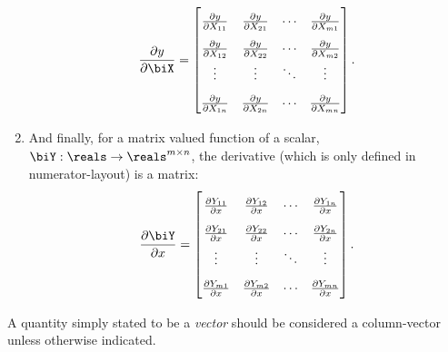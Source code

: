 \begin{enumerate}
\begin{equation*}
    \pdiff{y}{\biX} = \begin{bmatrix}
      \pdiff{y}{X_{11}} & \pdiff{y}{X_{21}} & \cdots & \pdiff{y}{X_{m1}}\\
      \pdiff{y}{X_{12}} & \pdiff{y}{X_{22}} & \cdots & \pdiff{y}{X_{m2}}\\
           \vdots       &      \vdots       & \ddots &      \vdots      \\
      \pdiff{y}{X_{1n}} & \pdiff{y}{X_{2n}} & \cdots & \pdiff{y}{X_{mn}}\\
    \end{bmatrix}.
  \end{equation*}
  \item And finally, for a matrix valued function of a scalar, $\biY : \reals\rightarrow \reals^{m\times n}$, the derivative (which is only defined in numerator-layout) is a matrix: \begin{equation*}\renewcommand{\arraystretch}{1.8}
    \pdiff{\biY}{x} = \begin{bmatrix}
      \pdiff{Y_{11}}{x} & \pdiff{Y_{12}}{x} & \cdots & \pdiff{Y_{1n}}{x}\\
      \pdiff{Y_{21}}{x} & \pdiff{Y_{22}}{x} & \cdots & \pdiff{Y_{2n}}{x}\\
          \vdots       &       \vdots       & \ddots &      \vdots     \\
      \pdiff{Y_{m1}}{x} & \pdiff{Y_{m2}}{x} & \cdots & \pdiff{Y_{mn}}{x}\\
    \end{bmatrix}.
  \end{equation*}
\end{enumerate}
A quantity simply stated to be a \emph{vector} should be considered a
column-vector unless otherwise indicated.
